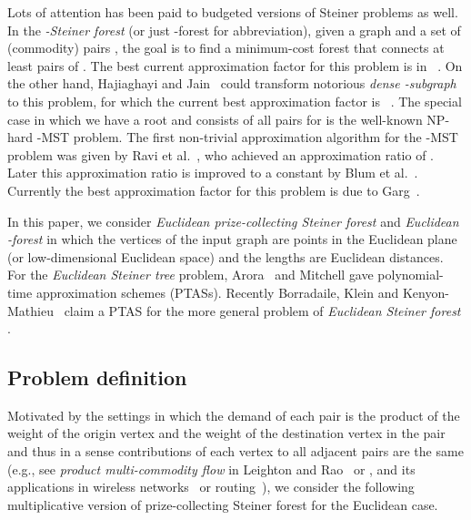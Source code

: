\documentclass[extras,11pt]{article} \usepackage{fullpage}
\theoremstyle{mytheorem}
\newcommand{\prob}[1]{\textit{#1}}
\begin{document}
Lots of attention has been paid to budgeted versions of Steiner problems
as well. In the \prob{-Steiner forest} (or just -forest for
abbreviation), given a graph  and a set of (commodity)
pairs , the goal is to find a minimum-cost forest that connects
at least  pairs of . The best current approximation factor
for this problem is in
~\cite{GHNR07}. On the other
hand, Hajiaghayi and Jain~\cite{HJ06} could transform notorious
\prob{dense -subgraph} to this problem, for which the current best
approximation factor is ~\cite{FKP01}. The
special case in which we have a root  and  consists of all
pairs  for  is the well-known NP-hard
-MST problem. The first non-trivial approximation algorithm for
the -MST problem was given by Ravi et al.~\cite{ch:18}, who
achieved an approximation ratio of . Later this
approximation ratio is improved to a constant by Blum et
al.~\cite{ch:7}. Currently the best approximation factor for this
problem is  due to Garg~\cite{ch:11}.

In this paper, we consider \prob{Euclidean prize-collecting Steiner
forest} and \prob{Euclidean -forest} in which  the vertices of the input graph are
points in the Euclidean plane (or \iffalse in\fi low-dimensional Euclidean
space) and the lengths are Euclidean distances. For the \prob{Euclidean
Steiner tree} problem, Arora~\cite{arora98:ptas} and Mitchell
\cite{cr:26} gave polynomial-time approximation schemes (PTASs).
    Recently Borradaile, Klein and Kenyon-Mathieu~\cite{BKM08:euc-for} claim a PTAS for the
  more general problem of \prob{Euclidean Steiner forest} .







\subsection{Problem definition}


Motivated by the settings in which the demand of each pair is the
product of the weight of the origin vertex and the weight of the
destination vertex in the pair and thus in a sense contributions of
each vertex to all adjacent pairs are the same (e.g., see {\em
product multi-commodity flow} in Leighton and Rao~\cite{LR99} or \cite{Bonsma,KS02}, and
its applications in wireless networks~\cite{MSL08} or
routing~\cite{CKS04,CKS05}), we consider the following multiplicative
version of prize-collecting Steiner forest for the Euclidean case.
\end{document}
